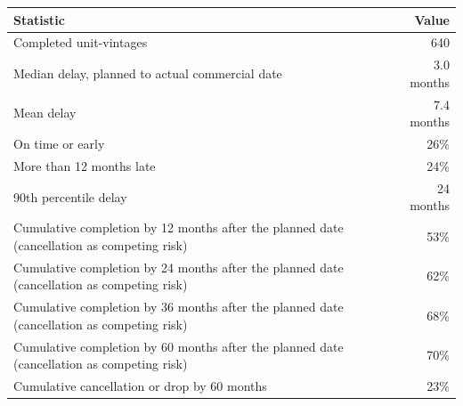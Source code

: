 \begin{tabular}{p{11cm}r}
\toprule
Statistic & Value \\
\midrule
Completed unit-vintages & 640 \\
Median delay, planned to actual commercial date & 3.0 months \\
Mean delay & 7.4 months \\
On time or early & 26\% \\
More than 12 months late & 24\% \\
90th percentile delay & 24 months \\
\midrule
Cumulative completion by 12 months after the planned date (cancellation as competing risk) & 53\% \\
Cumulative completion by 24 months after the planned date (cancellation as competing risk) & 62\% \\
Cumulative completion by 36 months after the planned date (cancellation as competing risk) & 68\% \\
Cumulative completion by 60 months after the planned date (cancellation as competing risk) & 70\% \\
Cumulative cancellation or drop by 60 months & 23\% \\
\bottomrule
\end{tabular}